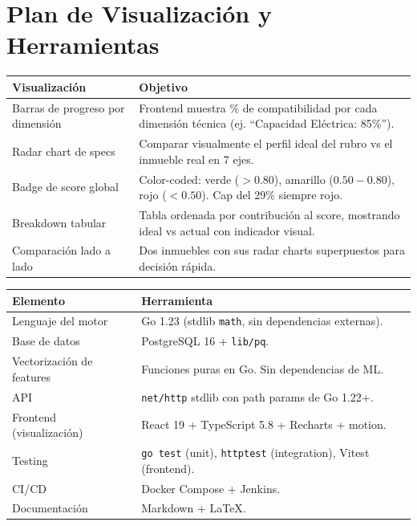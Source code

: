 \documentclass[11pt,a4paper]{article}
\begin{document}
\section{Plan de Visualización y Herramientas}
\begin{table}[H]
    \centering
    \renewcommand{\arraystretch}{1.2}
    \begin{tabularx}{\textwidth}{>{\hsize=0.35\hsize}X >{\hsize=0.65\hsize}X}
        \toprule
        \textbf{Visualización} & \textbf{Objetivo} \\
        \midrule
        Barras de progreso por dimensión & Frontend muestra \% de compatibilidad por cada dimensión técnica (ej. ``Capacidad Eléctrica: 85\%''). \\
        Radar chart de specs & Comparar visualmente el perfil ideal del rubro vs el inmueble real en 7 ejes. \\
        Badge de score global & Color-coded: verde ($>0.80$), amarillo ($0.50-0.80$), rojo ($<0.50$). Cap del 29\% siempre rojo. \\
        Breakdown tabular & Tabla ordenada por contribución al score, mostrando ideal vs actual con indicador visual. \\
        Comparación lado a lado & Dos inmuebles con sus radar charts superpuestos para decisión rápida. \\
        \bottomrule
    \end{tabularx}
\end{table}

\begin{table}[H]
    \centering
    \renewcommand{\arraystretch}{1.2}
    \begin{tabularx}{\textwidth}{l X}
        \toprule
        \textbf{Elemento} & \textbf{Herramienta} \\
        \midrule
        Lenguaje del motor & Go 1.23 (stdlib \texttt{math}, sin dependencias externas). \\
        Base de datos & PostgreSQL 16 + \texttt{lib/pq}. \\
        Vectorización de features & Funciones puras en Go. Sin dependencias de ML. \\
        API & \texttt{net/http} stdlib con path params de Go 1.22+. \\
        Frontend (visualización) & React 19 + TypeScript 5.8 + Recharts + motion. \\
        Testing & \texttt{go test} (unit), \texttt{httptest} (integration), Vitest (frontend). \\
        CI/CD & Docker Compose + Jenkins. \\
        Documentación & Markdown + \LaTeX. \\
        \bottomrule
    \end{tabularx}
\end{table}
\end{document}

